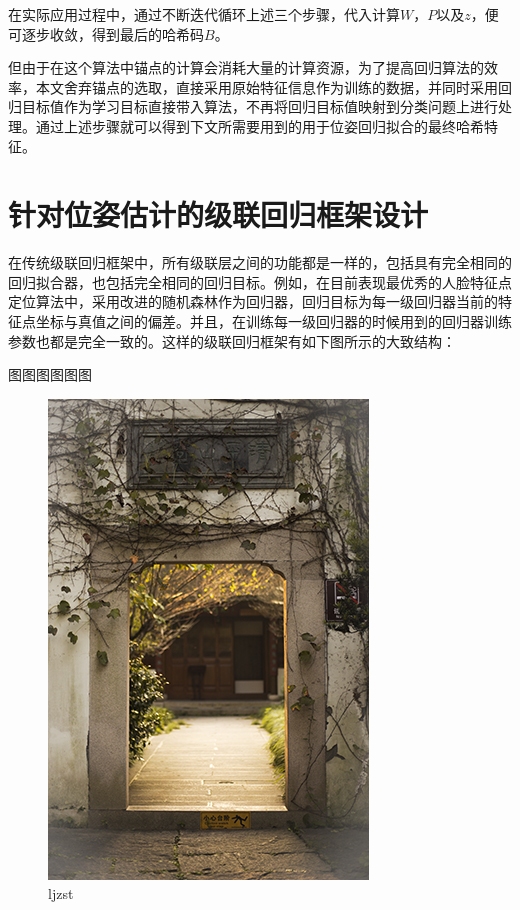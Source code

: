在实际应用过程中，通过不断迭代循环上述三个步骤，代入计算$W$，$P$以及$z$，便可逐步收敛，得到最后的哈希码$B$。

但由于在这个算法中锚点的计算会消耗大量的计算资源，为了提高回归算法的效率，本文舍弃锚点的选取，直接采用原始特征信息作为训练的数据，并同时采用回归目标值作为学习目标直接带入算法，不再将回归目标值映射到分类问题上进行处理。通过上述步骤就可以得到下文所需要用到的用于位姿回归拟合的最终哈希特征。

\section{针对位姿估计的级联回归框架设计}

在传统级联回归框架中，所有级联层之间的功能都是一样的，包括具有完全相同的回归拟合器，也包括完全相同的回归目标。例如，在目前表现最优秀的人脸特征点定位算法中\cite{chen2014joint}，采用改进的随机森林作为回归器，回归目标为每一级回归器当前的特征点坐标与真值之间的偏差。并且，在训练每一级回归器的时候用到的回归器训练参数也都是完全一致的。这样的级联回归框架有如下图所示的大致结构：

图图图图图图
\begin{figure}[htb]
	\centering 
	\includegraphics[scale=1.0]{./Pictures/test.jpg} 
	\caption{ljzst} 
\end{figure}

